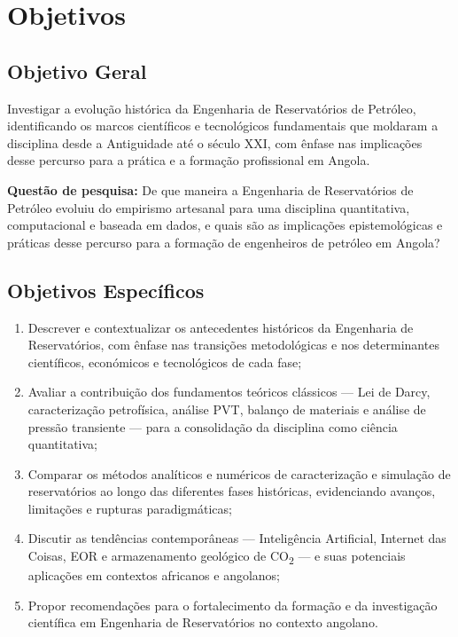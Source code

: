 \documentclass[
  12pt,
  a4paper,
  oneside,
  brazilian,
  sumario=tradicional
]{abntex2}
\begin{document}
\section{Objetivos}

\subsection{Objetivo Geral}

Investigar a evolução histórica da Engenharia de Reservatórios de
Petróleo, identificando os marcos científicos e tecnológicos
fundamentais que moldaram a disciplina desde a Antiguidade até o
século XXI, com ênfase nas implicações desse percurso para a prática
e a formação profissional em Angola.

\vspace{6pt}
\noindent
\textbf{Questão de pesquisa:} De que maneira a Engenharia de
Reservatórios de Petróleo evoluiu do empirismo artesanal para uma
disciplina quantitativa, computacional e baseada em dados, e quais são
as implicações epistemológicas e práticas desse percurso para a
formação de engenheiros de petróleo em Angola?

\subsection{Objetivos Específicos}

\begin{enumerate}[label=\alph*)]
  \item Descrever e contextualizar os antecedentes históricos da
    Engenharia de Reservatórios, com ênfase nas transições metodológicas
    e nos determinantes científicos, económicos e tecnológicos de
    cada fase;
  \item Avaliar a contribuição dos fundamentos teóricos clássicos —
    Lei de Darcy, caracterização petrofísica, análise PVT, balanço de
    materiais e análise de pressão transiente — para a consolidação da
    disciplina como ciência quantitativa;
  \item Comparar os métodos analíticos e numéricos de caracterização e
    simulação de reservatórios ao longo das diferentes fases históricas,
    evidenciando avanços, limitações e rupturas paradigmáticas;
  \item Discutir as tendências contemporâneas — Inteligência Artificial,
    Internet das Coisas, EOR e armazenamento geológico de
    CO\textsubscript{2} — e suas potenciais aplicações em contextos
    africanos e angolanos;
  \item Propor recomendações para o fortalecimento da formação e da
    investigação científica em Engenharia de Reservatórios no contexto
    angolano.
\end{enumerate}
\end{document}
